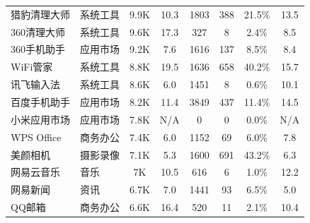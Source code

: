 \begin{ThreePartTable}
\begin{longtable}{l l c c c c c c}
        \rowcolor{gray!15} 猎豹清理大师 & 系统工具   & 9.9K                       & 10.3                       & 1803           & 388                        & 21.5\%       & 13.5                       \\
        360清理大师                     & 系统工具   & 9.6K                       & 17.3                       & 327            & 8                          & 2.4\%        & 8.5                        \\
        \rowcolor{gray!15} 360手机助手  & 应用市场   & 9.2K                       & 7.6                        & 1616           & 137                        & 8.5\%        & 8.4                        \\
        WiFi管家                        & 系统工具   & 8.8K                       & 19.5                       & 1636           & 658                        & 40.2\%       & 15.7                       \\
        \rowcolor{gray!15} 讯飞输入法   & 系统工具   & 8.6K                       & 6.0                        & 1451           & 8                          & 0.6\%        & 10.1                       \\
        百度手机助手                    & 应用市场   & 8.2K                       & 11.4                       & 3849           & 437                        & 11.4\%       & 14.5                       \\
        \rowcolor{gray!15} 小米应用市场 & 应用市场   & 7.8K                       & N/A                        & 0              & 0                          & 0.0\%        & N/A                        \\
        WPS Office                      & 商务办公   & 7.4K                       & 6.0                        & 1152           & 69                         & 6.0\%        & 7.8                        \\
        \rowcolor{gray!15} 美颜相机     & 摄影录像   & 7.1K                       & 5.3                        & 1600           & 691                        & 43.2\%       & 6.3                        \\
        网易云音乐                      & 音乐       & 7K                         & 10.5                       & 616            & 6                          & 1.0\%        & 12.2                       \\
        \rowcolor{gray!15} 网易新闻     & 资讯       & 6.7K                       & 7.0                        & 1441           & 93                         & 6.5\%        & 5.0                        \\
        QQ邮箱                          & 商务办公   & 6.6K                       & 16.4                       & 520            & 11                         & 2.1\%        & 10.4                       \\
        \bottomrule
    \end{longtable}
    \vspace{-4mm}
\end{ThreePartTable}

